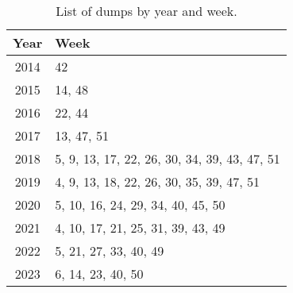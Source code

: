 
\begin{table}[htb!]
\centering
\begin{tabular}{cl}
\toprule
\textbf{Year} & \textbf{Week} \\ 
\midrule
2014         & 42               \\ 
2015         & 14, 48           \\ 
2016         & 22, 44           \\ 
2017         & 13, 47, 51       \\ 
2018         & 5, 9, 13, 17, 22, 26, 30, 34, 39, 43, 47, 51 \\ 
2019         & 4, 9, 13, 18, 22, 26, 30, 35, 39, 47, 51 \\ 
2020         & 5, 10, 16, 24, 29, 34, 40, 45, 50 \\ 
2021         & 4, 10, 17, 21, 25, 31, 39, 43, 49 \\ 
2022         & 5, 21, 27, 33, 40, 49 \\ 
2023         & 6, 14, 23, 40, 50 \\ 
\bottomrule
\end{tabular}
\caption{List of dumps by year and week.}
\label{tab:dumps_by_year}
\end{table}

